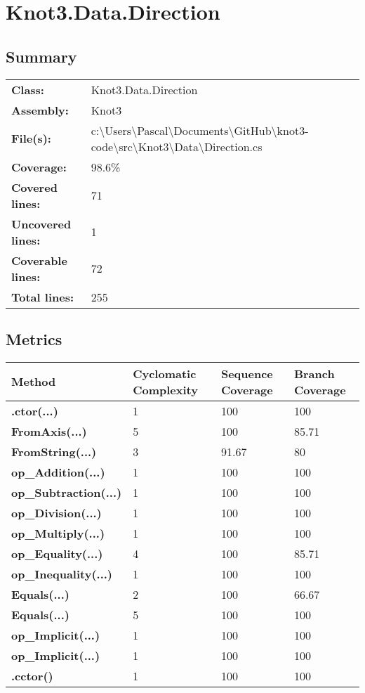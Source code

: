 \documentclass[a4paper,10pt]{article}
\begin{document}
\section{Knot3.Data.Direction}
\subsection{Summary}
\begin{longtable}[l]{ll}
\textbf{Class:} & Knot3.Data.Direction\\
\textbf{Assembly:} & Knot3\\
\textbf{File(s):} & \begin{minipage}[t]{12cm}{c:\textbackslash Users\textbackslash Pascal\textbackslash Documents\textbackslash GitHub\textbackslash knot3-code\textbackslash src\textbackslash Knot3\textbackslash Data\textbackslash Direction.cs}\end{minipage} \\
\textbf{Coverage:} & 98.6\%\\
\textbf{Covered lines:} & 71\\
\textbf{Uncovered lines:} & 1\\
\textbf{Coverable lines:} & 72\\
\textbf{Total lines:} & 255\\
\end{longtable}
\subsection{Metrics}
\begin{longtable}[l]{|l|l|l|l|}
\hline
\textbf{Method} & \textbf{Cyclomatic Complexity} & \textbf{Sequence Coverage} & \textbf{Branch Coverage}\\
\hline
\textbf{.ctor(...)} & 1 & 100 & 100\\
\hline
\textbf{FromAxis(...)} & 5 & 100 & 85.71\\
\hline
\textbf{FromString(...)} & 3 & 91.67 & 80\\
\hline
\textbf{op\_Addition(...)} & 1 & 100 & 100\\
\hline
\textbf{op\_Subtraction(...)} & 1 & 100 & 100\\
\hline
\textbf{op\_Division(...)} & 1 & 100 & 100\\
\hline
\textbf{op\_Multiply(...)} & 1 & 100 & 100\\
\hline
\textbf{op\_Equality(...)} & 4 & 100 & 85.71\\
\hline
\textbf{op\_Inequality(...)} & 1 & 100 & 100\\
\hline
\textbf{Equals(...)} & 2 & 100 & 66.67\\
\hline
\textbf{Equals(...)} & 5 & 100 & 100\\
\hline
\textbf{op\_Implicit(...)} & 1 & 100 & 100\\
\hline
\textbf{op\_Implicit(...)} & 1 & 100 & 100\\
\hline
\textbf{.cctor()} & 1 & 100 & 100\\
\hline
\end{longtable}
\end{document}
